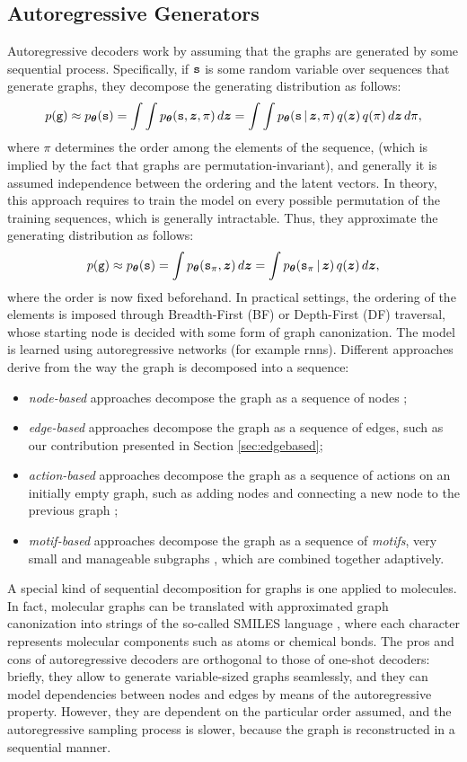 \subsection{Autoregressive Generators}
Autoregressive decoders work by assuming that the graphs are generated by some sequential process. Specifically, if $\mathtt{s}$ is some random variable over sequences that generate graphs, they decompose the generating distribution as follows:
$$p(\Graph{g}) \approx p_{\Param}(\Seq{s}) = \int\int p_{\Param}(\Seq{s}, \Vector{z}, \pi)\, d\Vector{z} = \int\int p_{\Param}(\Seq{s} \given \Vector{z}, \pi)\, q(\Vector{z})\, q(\pi)\, d\Vector{z}\, d\pi,$$
where $\pi$ determines the order among the elements of the sequence, (which is implied by the fact that graphs are permutation-invariant), and generally it is assumed independence between the ordering and the latent vectors. In theory, this approach requires to train the model on every possible permutation of the training sequences, which is generally intractable. Thus, they approximate the generating distribution as follows:
$$p(\Graph{g}) \approx p_{\Param}(\Seq{s}) = \int p_{\Param}(\Seq{s}_{\pi}, \Vector{z})\, d\Vector{z} = \int p_{\Param}(\Seq{s}_{\pi} \given \Vector{z})\, q(\Vector{z})\, d\Vector{z},$$
where the order is now fixed beforehand. In practical settings, the ordering of the elements is imposed through Breadth-First (BF) or Depth-First (DF) traversal, whose starting node is decided with some form of graph canonization. The model is learned using autoregressive networks (for example \glspl{rnn}). Different approaches derive from the way the graph is decomposed into a sequence:
\begin{itemize}
    \item \emph{node-based} approaches decompose the graph as a sequence of nodes \citep{you2018graphrnn};
    \item \emph{edge-based} approaches decompose the graph as a sequence of edges, such as our contribution presented in Section \ref{sec:edgebased};
    \item \emph{action-based} approaches decompose the graph as a sequence of actions on an initially empty graph, such as adding nodes and connecting a new node to the previous graph \citep{li2018learningdeepgmg};
    \item \emph{motif-based} approaches decompose the graph as a sequence of \emph{motifs}, \ie very small and manageable subgraphs \citep{jin2018jtvae}, which are combined together adaptively.
\end{itemize}
A special kind of sequential decomposition for graphs is one applied to molecules. In fact, molecular graphs can be translated with approximated graph canonization into strings of the so-called SMILES language \citep{weininger1988smiles}, where each character represents molecular components such as atoms or chemical bonds.
The pros and cons of autoregressive decoders are orthogonal to those of one-shot decoders: briefly, they allow to generate variable-sized graphs seamlessly, and they can model dependencies between nodes and edges by means of the autoregressive property. However, they are dependent on the particular order assumed, and the autoregressive sampling process is slower, because the graph is reconstructed in a sequential manner.